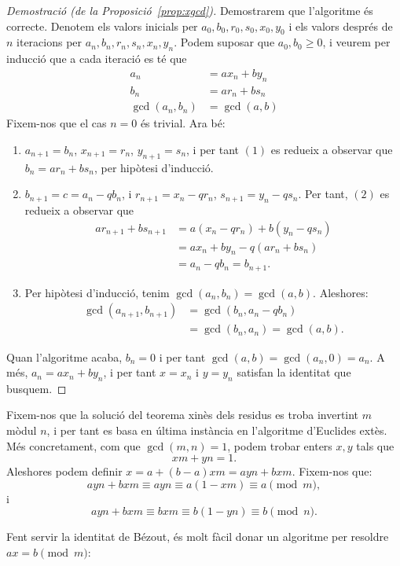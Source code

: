  \begin{proof}[Demostració (de la Proposició~\ref{prop:xgcd})]
    Demostrarem que l'algoritme és correcte. Denotem els valors inicials per $a_0, b_0, r_0, s_0, x_0, y_0$ i els valors després de $n$ iteracions per $a_n, b_n, r_n, s_n, x_n, y_n$. Podem suposar que $a_0, b_0\geq 0$, i veurem per inducció que a cada iteració es té que
    \begin{align*}
    a_n &= a x_n + b y_n\\
    b_n &= a r_n + b s_n\\
    \gcd(a_n,b_n)&=\gcd(a,b)
    \end{align*}
    Fixem-nos que el cas $n=0$ és trivial. Ara bé:
    \begin{enumerate}
        \item $a_{n+1} = b_n$, $x_{n+1} = r_n$, $y_{n+1}=s_n$, i per tant $(1)$ es redueix a observar que $b_n = a r_n + b s_n$, per hipòtesi d'inducció.
        \item $b_{n+1} = c = a_n - qb_n$, i $r_{n+1} = x_n-qr_n$, $s_{n+1} = y_n-qs_n$. Per tant, $(2)$ es redueix a observar que
        \begin{align*}
        ar_{n+1}+bs_{n+1}&=a(x_n-qr_n) + b(y_n-qs_n)\\
        &=ax_n+by_n -q(ar_n+bs_n)\\
        &=a_n-qb_n =b_{n+1}.
        \end{align*}
        \item Per hipòtesi d'inducció, tenim $\gcd(a_n,b_n)=\gcd(a,b)$. Aleshores:
        \begin{align*}
        \gcd(a_{n+1},b_{n+1})&=\gcd(b_n,a_n-qb_n)\\
        &=\gcd(b_n,a_n)=\gcd(a,b).
        \end{align*}
    \end{enumerate}
Quan l'algoritme acaba, $b_n=0$ i per tant $\gcd(a,b)=\gcd(a_n,0)=a_n$. A més, $a_n = ax_n+by_n$, i per tant $x=x_n$ i $y=y_n$ satisfan la identitat que busquem.
 \end{proof}

  \begin{remark}
  Fixem-nos que la solució del teorema xinès dels residus es troba invertint $m$ mòdul $n$, i per tant es basa en última instància en l'algoritme d'Euclides extès. Més concretament, com que $\gcd(m,n)=1$, podem trobar enters $x,y$ tals que
  \[
  xm+yn=1.
  \]
  Aleshores podem definir $x=a + (b-a)xm=ayn + bxm$. Fixem-nos que:
  \[
  ayn + bxm \equiv ayn \equiv a(1-xm)\equiv a\pmod m,
  \]
  i
  \[
  ayn + bxm \equiv bxm \equiv b(1-yn)\equiv b\pmod n.
  \]
  \end{remark}
 Fent servir la identitat de Bézout, és molt fàcil donar un algoritme per resoldre $ax = b\pmod m$:
 
